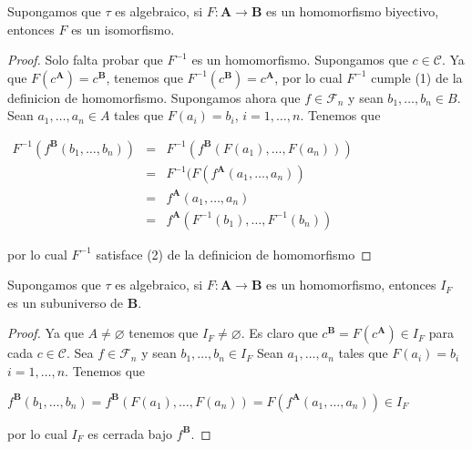   \begin{lemma} \label{lemma_50}
    \PN Supongamos que $\tau$ es algebraico, si $F: \mathbf{A} \rightarrow \mathbf{B}$ es un homomorfismo biyectivo,
    entonces $F$ es un isomorfismo.
  \end{lemma}
  \begin{proof}
    Solo falta probar que $F^{-1}$ es un homomorfismo. Supongamos que $c\in \mathcal{C}$. Ya que $F(c^{\mathbf{A}})=c^{\mathbf{B}}$, tenemos que $ F^{-1}(c^{\mathbf{B}})=c^{\mathbf{A}}$, por lo cual $F^{-1}$ cumple (1) de la definicion de homomorfismo. Supongamos ahora que $f\in \mathcal{F}_{n}$ y sean $b_{1}, \dotsc, b_{n}\in B$. Sean $a_{1}, \dotsc, a_{n}\in A$ tales que $ F(a_{i})=b_{i}$, $i=1, \dotsc, n$. Tenemos que

    $\displaystyle \begin{array}{ccl} F^{-1}(f^{\mathbf{B}}(b_{1}, \dotsc, b_{n})) & = & F^{-1}(f^{\mathbf{B} }(F(a_{1}), \dotsc, F(a_{n}))) \\ & = & F^{-1}(F(f^{\mathbf{A}}(a_{1}, \dotsc, a_{n})) \\ & = & f^{\mathbf{A}}(a_{1}, \dotsc, a_{n}) \\ & = & f^{\mathbf{A}}(F^{-1}(b_{1}), \dotsc, F^{-1}(b_{n})) \end{array} $

    por lo cual $F^{-1}$ satisface (2) de la definicion de homomorfismo
  \end{proof}

  \begin{lemma} \label{lemma_51}
    \PN Supongamos que $\tau$ es algebraico, si $F: \mathbf{A} \rightarrow \mathbf{B}$ es un homomorfismo, entonces
    $I_{F}$ es un subuniverso de $\mathbf{B}$.
  \end{lemma}
  \begin{proof}
    Ya que $A\neq \varnothing $ tenemos que $I_{F}\neq \varnothing .$ Es claro que $ c^{\mathbf{B}}=F(c^{\mathbf{A}})\in I_{F}$ para cada $c\in \mathcal{C}$. Sea $f\in \mathcal{F}_{n}$ y sean $b_{1}, \dotsc, b_{n}\in I_{F}$ Sean $ a_{1}, \dotsc, a_{n}$ tales que $F(a_{i})=b_{i}$ $i=1, \dotsc, n$. Tenemos que

    $\displaystyle f^{\mathbf{B}}(b_{1}, \dotsc, b_{n})=f^{\mathbf{B}}(F(a_{1}), \dotsc, F(a_{n}))=F(f^{ \mathbf{A}}(a_{1}, \dotsc, a_{n}))\in I_{F} $

    por lo cual $I_{F}$ es cerrada bajo $f^{\mathbf{B}}$.
  \end{proof}

